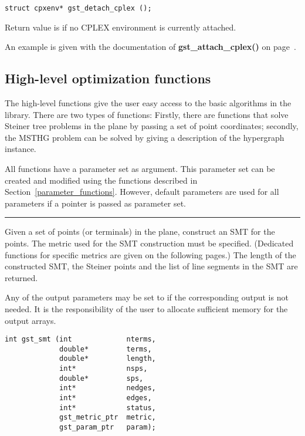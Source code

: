\begin{verbatim}
struct cpxenv* gst_detach_cplex ();

\end{verbatim}
Return value is  if no CPLEX environment is currently attached.

An example is given with the documentation of {\bf
gst\_attach\_cplex()} on page~\pageref{gst_attach_cplex}.

\clearpage\subsection{High-level optimization functions}
\label{high_level_functions}
The high-level functions give the user easy access to the basic
algorithms in the library. There are two types of functions:
Firstly, there are functions that solve Steiner tree problems in the
plane by passing a set of point coordinates; secondly, the MSTHG
problem can be solved by giving a description of the hypergraph
instance. 

All functions have a parameter set as argument. This parameter set can
be created and modified using the functions described in
Section~\ref{parameter_functions}. However, default parameters are
used for all parameters if a  pointer is passed as
parameter set.
 

\clearpage{}
\label{gst_smt}

\hrule
\vskip 0.25in
Given a set of points (or terminals) in the plane, construct an SMT for the
points. The metric used for the SMT construction must be specified.
(Dedicated functions for specific metrics are given on the following pages.)
The length of the constructed SMT, the Steiner points and the list of
line segments in the SMT are returned.

Any of the output parameters may be set to  if the corresponding
output is not needed. It is the responsibility of the user to allocate
sufficient memory for the output arrays.
\vspace*{-0.3cm}

\begin{verbatim}
int gst_smt (int             nterms,
             double*         terms,
             double*         length,
             int*            nsps,
             double*         sps,
             int*            nedges,
             int*            edges,
             int*            status,
             gst_metric_ptr  metric,
             gst_param_ptr   param);

\end{verbatim}

